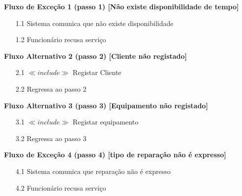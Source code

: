 \documentclass[../relatorio.tex]{subfiles}
\begin{document}
\begin{itemize}
          \begin{flushleft}
              \textbf{Fluxo de Exceção 1 (passo 1) [Não existe disponibilidade de tempo]}
          \end{flushleft}
          \begin{itemize}
              \item[1.1]{Sistema comunica que não existe disponibilidade}
              \item[1.2]{Funcionário recusa serviço}
          \end{itemize}
          \begin{flushleft}
              \textbf{Fluxo Alternativo 2 (passo 2) [Cliente não registado]}
          \end{flushleft}
          \begin{itemize}
              \item[2.1]{$\ll include \gg$ Registar Cliente}
              \item[2.2] {Regressa ao passo 2}
          \end{itemize}
          \begin{flushleft}
              \textbf{Fluxo Alternativo 3 (passo 3) [Equipamento não registado]}
          \end{flushleft}
          \begin{itemize}
              \item[3.1] $\ll include \gg$ Registar equipamento
              \item[3.2] Regressa ao passo 3
          \end{itemize}
          \begin{flushleft}
              \textbf{Fluxo de Exceção 4 (passo 4) [tipo de reparação não é expresso]}
          \end{flushleft}
          \begin{itemize}
              \item[4.1]{Sistema comunica que reparação não é expresso}
              \item[4.2]{Funcionário recusa serviço}
          \end{itemize}
\end{itemize}
\end{document}
